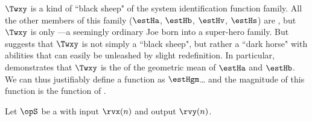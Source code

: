 \begin{remark}
\label{rem:HgmTxy_gen}
 $\Twxy$ is a kind of ``black sheep" of the system identification function family.
All the other members of this family ($\estHa$, $\estHb$, $\estHv$, $\estHs$) are ,
but $\Twxy$ is only ---a seemingly ordinary Joe born into a super-hero family.
But  suggests that $\Twxy$ is not simply a ``black sheep", but
rather a ``dark horse" with abilities that can easily be unleashed by slight redefinition.
In particular,  demonstrates that $\Twxy$ is the  of the geometric mean of
$\estHa$ and $\estHb$.
We can thus justifiably define a  function as $\estHgm$\ldots
and the magnitude of this  function is the 
function of .
\end{remark}

\begin{definition}                           %
\label{def:Hhm}                              %
Let $\opS$ be a  with input $\rvx(n)$ and output $\rvy(n)$.
\end{definition}

